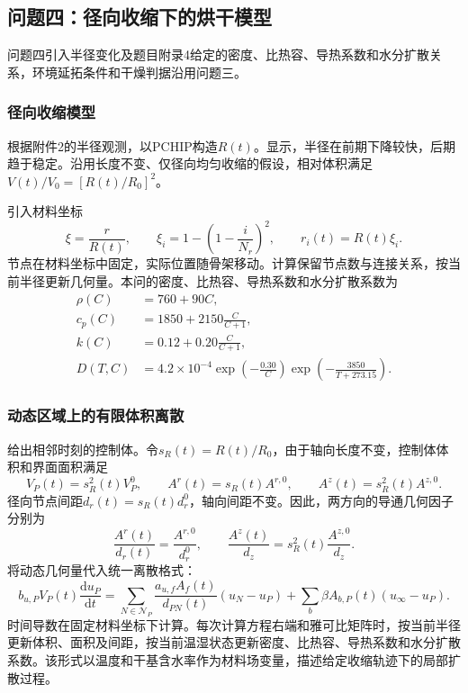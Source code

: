 \FloatBarrier
\subsection{问题四：径向收缩下的烘干模型}
问题四引入半径变化及题目附录4给定的密度、比热容、导热系数和水分扩散关系，环境延拓条件和干燥判据沿用问题三。
\subsubsection{径向收缩模型}
根据附件2的半径观测，以PCHIP构造$R(t)$。显示，半径在前期下降较快，后期趋于稳定。沿用长度不变、仅径向均匀收缩的假设，相对体积满足$V(t)/V_0=[R(t)/R_0]^2$。

引入材料坐标
\begin{equation}\label{eq:material}
\xi=\frac r{R(t)},\qquad
\xi_i=1-\left(1-\frac i{N_r}\right)^2,\qquad
r_i(t)=R(t)\xi_i.
\end{equation}
节点在材料坐标中固定，实际位置随骨架移动。计算保留节点数与连接关系，按当前半径更新几何量。本问的密度、比热容、导热系数和水分扩散系数为
\begin{equation}\label{eq:q4-properties}
\begin{aligned}
\rho(C)&=760+90C,\\
c_p(C)&=1850+2150\frac C{C+1},\\
k(C)&=0.12+0.20\frac C{C+1},\\
D(T,C)&=4.2\times10^{-4}
\exp\left(-\frac{0.30}{C}\right)
\exp\left(-\frac{3850}{T+273.15}\right).
\end{aligned}
\end{equation}

\subsubsection{动态区域上的有限体积离散}
给出相邻时刻的控制体。令$s_R(t)=R(t)/R_0$，由于轴向长度不变，控制体体积和界面面积满足
\begin{equation}\label{eq:geometry-scaling}
V_P(t)=s_R^2(t)V_P^0,\qquad
A^r(t)=s_R(t)A^{r,0},\qquad
A^z(t)=s_R^2(t)A^{z,0}.
\end{equation}
径向节点间距$d_r(t)=s_R(t)d_r^0$，轴向间距不变。因此，两方向的导通几何因子分别为
\begin{equation}
\frac{A^r(t)}{d_r(t)}=\frac{A^{r,0}}{d_r^0},\qquad
\frac{A^z(t)}{d_z}=s_R^2(t)\frac{A^{z,0}}{d_z}.
\end{equation}
将动态几何量代入统一离散格式：
\begin{equation}\label{eq:moving-fvm}
b_{u,P}V_P(t)\frac{\mathrm du_P}{\mathrm dt}
=\sum_{N\in\mathcal N_P}
\frac{a_{u,f}A_f(t)}{d_{PN}(t)}(u_N-u_P)
+\sum_b\beta A_{b,P}(t)(u_\infty-u_P).
\end{equation}
时间导数在固定材料坐标下计算。每次计算方程右端和雅可比矩阵时，按当前半径更新体积、面积及间距，按当前温湿状态更新密度、比热容、导热系数和水分扩散系数。该形式以温度和干基含水率作为材料场变量，描述给定收缩轨迹下的局部扩散过程。

